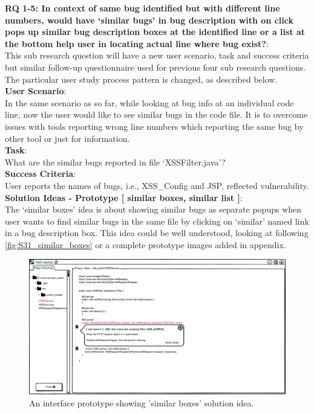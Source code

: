 \clearpage
\textbf{RQ 1-5: In context of same bug identified but with different line numbers, would have ‘similar bugs’ in bug description with on click pops up similar bug description boxes at the identified line or a list at the bottom help user in locating actual line where bug exist?}: \\


This sub research question will have a new user scenario, task and success criteria but similar follow-up questionnaire used for previous four sub research questions. The particular user study process pattern is changed, as described below. \\

\textbf{User Scenario}: \\

In the same scenario as so far, while looking at bug info at an individual code line, now the user would like to see similar bugs in the code file. It is to overcome issues with tools reporting wrong line numbers which reporting the same bug by other tool or just for information. \\



\textbf{Task}: \\

What are the similar bugs reported in file ‘XSSFilter.java’? \\

\textbf{Success Criteria}: \\

User reports the names of bugs, i.e., XSS\_Config and JSP, reflected vulnerability. \\


\textbf{Solution Ideas - Prototype [ similar boxes, similar list ]}: \\

The ‘similar boxes’ idea is about showing similar bugs as separate popups when user wants to find similar bugs in the same file by clicking on ‘similar’ named link in a bug description box. This idea could be well understood, looking at following \autoref{fig:S31_similar_boxes} or a complete prototype images added in appendix. \\

\begin{figure}[hbt!]
	\centering
	\includegraphics[width=\linewidth]{figures/solution_ideas_snaps/S31_similar_boxes}
	\caption{An interface prototype showing 'similar boxes' solution idea.}
	\label{fig:S31_similar_boxes}
\end{figure} 

